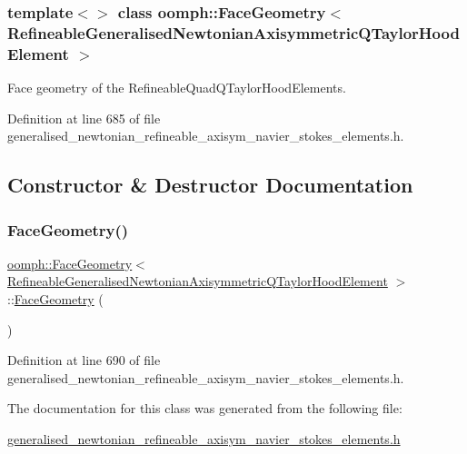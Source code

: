 \subsubsection*{template$<$$>$\newline
class oomph\+::\+Face\+Geometry$<$ Refineable\+Generalised\+Newtonian\+Axisymmetric\+Q\+Taylor\+Hood\+Element $>$}

Face geometry of the Refineable\+Quad\+Q\+Taylor\+Hood\+Elements. 

Definition at line 685 of file generalised\+\_\+newtonian\+\_\+refineable\+\_\+axisym\+\_\+navier\+\_\+stokes\+\_\+elements.\+h.



\subsection{Constructor \& Destructor Documentation}
\mbox{\label{classoomph_1_1FaceGeometry_3_01RefineableGeneralisedNewtonianAxisymmetricQTaylorHoodElement_01_4_a4f74e4b3980deba3995225e37cca04fd}} 
\subsubsection{\texorpdfstring{Face\+Geometry()}{FaceGeometry()}}
{\footnotesize\ttfamily \hyperlink{classoomph_1_1FaceGeometry}{oomph\+::\+Face\+Geometry}$<$ \hyperlink{classoomph_1_1RefineableGeneralisedNewtonianAxisymmetricQTaylorHoodElement}{Refineable\+Generalised\+Newtonian\+Axisymmetric\+Q\+Taylor\+Hood\+Element} $>$\+::\hyperlink{classoomph_1_1FaceGeometry}{Face\+Geometry} (\begin{DoxyParamCaption}{ }\end{DoxyParamCaption})\hspace{0.3cm}{\ttfamily [inline]}}



Definition at line 690 of file generalised\+\_\+newtonian\+\_\+refineable\+\_\+axisym\+\_\+navier\+\_\+stokes\+\_\+elements.\+h.



The documentation for this class was generated from the following file\+:\begin{DoxyCompactItemize}
\item 
\hyperlink{generalised__newtonian__refineable__axisym__navier__stokes__elements_8h}{generalised\+\_\+newtonian\+\_\+refineable\+\_\+axisym\+\_\+navier\+\_\+stokes\+\_\+elements.\+h}\end{DoxyCompactItemize}
